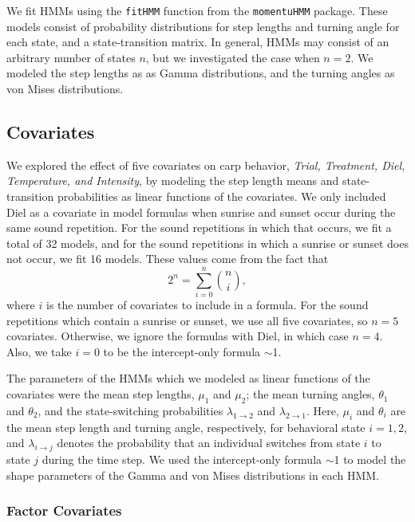 \documentclass[12pt]{article}
\begin{document}
		We fit HMMs using the \texttt{fitHMM} function from the \texttt{momentuHMM} package. These models consist of probability distributions for step lengths and turning angle for each state, and a state-transition matrix. In general, HMMs may consist of an arbitrary number of states $n$, but we investigated the case when $n = 2$. We modeled the step lengths as as Gamma distributions, and the turning angles as von Mises distributions.
	
	\subsection{Covariates}
	
		We explored the effect of five covariates on carp behavior, \emph{Trial, Treatment, Diel, Temperature, and Intensity}, by modeling the step length means and state-transition probabilities as linear functions of the covariates. We only included Diel as a covariate in model formulas when sunrise and sunset occur during the same sound repetition. For the sound repetitions in which that occurs, we fit a total of 32 models, and for the sound repetitions in which a sunrise or sunset does not occur, we fit 16 models. These values come from the fact that
		\[2^n = \sum_{i=0}^n {n \choose i},\]
		where $i$ is the number of covariates to include in a formula. For the sound repetitions which contain a sunrise or sunset, we use all five covariates, so $n = 5$ covariates. Otherwise, we ignore the formulas with Diel, in which case $n = 4$. Also, we take $i = 0$ to be the intercept-only formula $\sim$1.
		
		The parameters of the HMMs which we modeled as linear functions of the covariates were the mean step lengths, $\mu_1$ and $\mu_2$; the mean turning angles, $\theta_1$ and $\theta_2$, and the state-switching probabilities $\lambda_{1 \to 2}$ and $\lambda_{2 \to 1}$. Here, $\mu_i$ and $\theta_i$ are the mean step length and turning angle, respectively, for behavioral state $i = 1, 2$, and $\lambda_{i \to j}$ denotes the probability that an individual switches from state $i$ to state $j$ during the time step. We used the intercept-only formula $\sim$1 to model the shape parameters of the Gamma and von Mises distributions in each HMM.
		
		
		
		\subsubsection{Factor Covariates}
		
\end{document}
